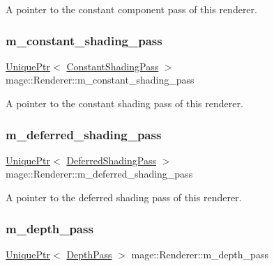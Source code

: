A pointer to the constant component pass of this renderer. \hypertarget{classmage_1_1_renderer_af6536c9471209a50c8630e0b49a45177}{}\label{classmage_1_1_renderer_af6536c9471209a50c8630e0b49a45177} 
\subsubsection{\texorpdfstring{m\+\_\+constant\+\_\+shading\+\_\+pass}{m\_constant\_shading\_pass}}
{\footnotesize\ttfamily \hyperlink{namespacemage_a3316d7143a973e37adf1110f2e80ca31}{Unique\+Ptr}$<$ \hyperlink{classmage_1_1_constant_shading_pass}{Constant\+Shading\+Pass} $>$ mage\+::\+Renderer\+::m\+\_\+constant\+\_\+shading\+\_\+pass\hspace{0.3cm}{\ttfamily [private]}}

A pointer to the constant shading pass of this renderer. \hypertarget{classmage_1_1_renderer_a0179c9a4fe8b2c6d090a96adc94383b0}{}\label{classmage_1_1_renderer_a0179c9a4fe8b2c6d090a96adc94383b0} 
\subsubsection{\texorpdfstring{m\+\_\+deferred\+\_\+shading\+\_\+pass}{m\_deferred\_shading\_pass}}
{\footnotesize\ttfamily \hyperlink{namespacemage_a3316d7143a973e37adf1110f2e80ca31}{Unique\+Ptr}$<$ \hyperlink{classmage_1_1_deferred_shading_pass}{Deferred\+Shading\+Pass} $>$ mage\+::\+Renderer\+::m\+\_\+deferred\+\_\+shading\+\_\+pass\hspace{0.3cm}{\ttfamily [private]}}

A pointer to the deferred shading pass of this renderer. \hypertarget{classmage_1_1_renderer_a8c0dc117b4df9685e9e049175e5a91a6}{}\label{classmage_1_1_renderer_a8c0dc117b4df9685e9e049175e5a91a6} 
\subsubsection{\texorpdfstring{m\+\_\+depth\+\_\+pass}{m\_depth\_pass}}
{\footnotesize\ttfamily \hyperlink{namespacemage_a3316d7143a973e37adf1110f2e80ca31}{Unique\+Ptr}$<$ \hyperlink{classmage_1_1_depth_pass}{Depth\+Pass} $>$ mage\+::\+Renderer\+::m\+\_\+depth\+\_\+pass\hspace{0.3cm}{\ttfamily [private]}}

